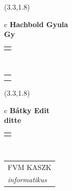 \documentclass[11pt]{article}
\begin{document}
\makebox(3.3,1.8){
  \renewcommand\arraystretch{1.3}
  \begin{tabular}[c]{c}
    \hspace{8.5mm}
    \LARGE\bf{ Hachbold Gyula }\\
    \hspace{8.5mm}
    \Large{ Gy }\\
    \renewcommand\arraystretch{3}
    \begin{tabular}[c]{c}
      \centering
      \fontfamily{phv}\selectfont{
        \textbf{
          \textsc{
            \scriptsize{
            \color{Bright}{ Ismerkedő }\color{Dark}{ Webmester }\color{Bright}{ Sminkmester }\color{Bright}{ Programozó }
            }
          }
        }
      }
    \end{tabular}
    \\
    \renewcommand\arraystretch{1}
    \begin{tabular}{p{3.3in}}
      \hspace{.7cm}\\
      \hspace{.7cm}\emph{  }\\
    \end{tabular}
  \end{tabular}
}

\makebox(3.3,1.8){
  \renewcommand\arraystretch{1.3}
  \begin{tabular}[c]{c}
    \hspace{8.5mm}
    \LARGE\bf{ Bátky Edit }\\
    \hspace{8.5mm}
    \Large{ ditte }\\
    \renewcommand\arraystretch{3}
    \begin{tabular}[c]{c}
      \centering
      \fontfamily{phv}\selectfont{
        \textbf{
          \textsc{
            \scriptsize{
            \color{Dark}{ Ismerkedő }\color{Bright}{ Webmester }\color{Bright}{ Sminkmester }\color{Bright}{ Programozó }
            }
          }
        }
      }
    \end{tabular}
    \\
    \renewcommand\arraystretch{1}
    \begin{tabular}{p{3.3in}}
      \hspace{.7cm}FVM KASZK\\
      \hspace{.7cm}\emph{ informatikus }\\
    \end{tabular}
  \end{tabular}
}
\end{document}
